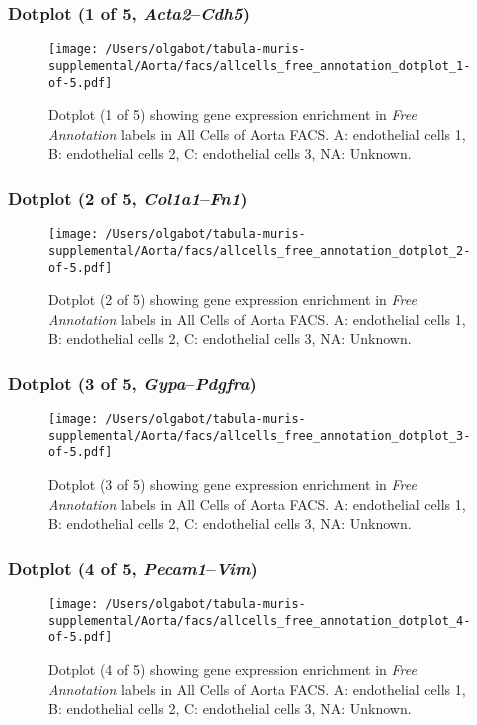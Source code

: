 \clearpage

\subsubsection{Dotplot (1 of 5, \emph{Acta2}--\emph{Cdh5})}
\begin{figure}[h]
\centering
\texttt{[image: /Users/olgabot/tabula-muris-supplemental/Aorta/facs/allcells\_free\_annotation\_dotplot\_1-of-5.pdf]}

\caption{ Dotplot (1 of 5)  showing gene expression enrichment in \emph{Free Annotation} labels in All Cells of Aorta FACS. A: endothelial cells 1, B: endothelial cells 2, C: endothelial cells 3, NA: Unknown.}
\end{figure}


\clearpage

\subsubsection{Dotplot (2 of 5, \emph{Col1a1}--\emph{Fn1})}
\begin{figure}[h]
\centering
\texttt{[image: /Users/olgabot/tabula-muris-supplemental/Aorta/facs/allcells\_free\_annotation\_dotplot\_2-of-5.pdf]}

\caption{ Dotplot (2 of 5)  showing gene expression enrichment in \emph{Free Annotation} labels in All Cells of Aorta FACS. A: endothelial cells 1, B: endothelial cells 2, C: endothelial cells 3, NA: Unknown.}
\end{figure}


\clearpage

\subsubsection{Dotplot (3 of 5, \emph{Gypa}--\emph{Pdgfra})}
\begin{figure}[h]
\centering
\texttt{[image: /Users/olgabot/tabula-muris-supplemental/Aorta/facs/allcells\_free\_annotation\_dotplot\_3-of-5.pdf]}

\caption{ Dotplot (3 of 5)  showing gene expression enrichment in \emph{Free Annotation} labels in All Cells of Aorta FACS. A: endothelial cells 1, B: endothelial cells 2, C: endothelial cells 3, NA: Unknown.}
\end{figure}


\clearpage

\subsubsection{Dotplot (4 of 5, \emph{Pecam1}--\emph{Vim})}
\begin{figure}[h]
\centering
\texttt{[image: /Users/olgabot/tabula-muris-supplemental/Aorta/facs/allcells\_free\_annotation\_dotplot\_4-of-5.pdf]}

\caption{ Dotplot (4 of 5)  showing gene expression enrichment in \emph{Free Annotation} labels in All Cells of Aorta FACS. A: endothelial cells 1, B: endothelial cells 2, C: endothelial cells 3, NA: Unknown.}
\end{figure}


